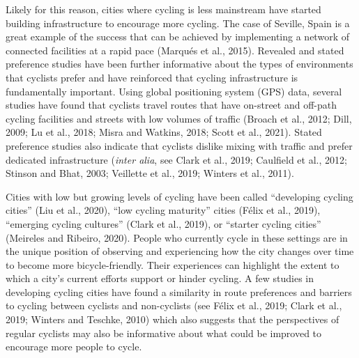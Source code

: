 \documentclass[]{elsarticle} %
\begin{document}
Likely for this reason, cities where cycling is less mainstream have
started building infrastructure to encourage more cycling. The case of
Seville, Spain is a great example of the success that can be achieved by
implementing a network of connected facilities at a rapid pace (Marqués
et al., 2015). Revealed and stated preference studies have been further
informative about the types of environments that cyclists prefer and
have reinforced that cycling infrastructure is fundamentally important.
Using global positioning system (GPS) data, several studies have found
that cyclists travel routes that have on-street and off-path cycling
facilities and streets with low volumes of traffic (Broach et al., 2012;
Dill, 2009; Lu et al., 2018; Misra and Watkins, 2018; Scott et al.,
2021). Stated preference studies also indicate that cyclists dislike
mixing with traffic and prefer dedicated infrastructure (\emph{inter
alia}, see Clark et al., 2019; Caulfield et al., 2012; Stinson and Bhat,
2003; Veillette et al., 2019; Winters et al., 2011).

Cities with low but growing levels of cycling have been called
``developing cycling cities'' (Liu et al., 2020), ``low cycling
maturity'' cities (Félix et al., 2019), ``emerging cycling cultures''
(Clark et al., 2019), or ``starter cycling cities'' (Meireles and
Ribeiro, 2020). People who currently cycle in these settings are in the
unique position of observing and experiencing how the city changes over
time to become more bicycle-friendly. Their experiences can highlight
the extent to which a city's current efforts support or hinder cycling.
A few studies in developing cycling cities have found a similarity in
route preferences and barriers to cycling between cyclists and
non-cyclists (see Félix et al., 2019; Clark et al., 2019; Winters and
Teschke, 2010) which also suggests that the perspectives of regular
cyclists may also be informative about what could be improved to
encourage more people to cycle.
\end{document}
